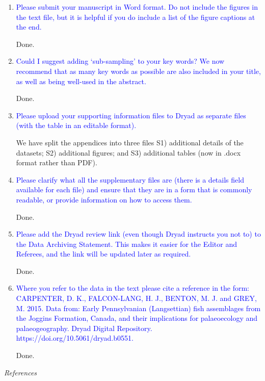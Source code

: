 \documentclass[12pt,letterpaper]{article}
\renewcommand{\subsection}[1]{%
\bigskip
\begin{center}
\begin{large}
\normalfont\itshape #1
\end{large}
\end{center}}
\begin{document}
\begin{enumerate}

\item{\textcolor{blue}{Please submit your manuscript in Word format. Do not include the figures in the text file, but it is helpful if you do include a list of the figure captions at the end.}}

Done.

\item{\textcolor{blue}{Could I suggest adding ‘sub-sampling’ to your key words? We now recommend that as many key words as possible are also included in your title, as well as being well-used in the abstract.}}

Done.

\item{\textcolor{blue}{Please upload your supporting information files to Dryad as separate files (with the table in an editable format).}}

We have split the appendices into three files S1) additional details of the datasets; S2) additional figures; and S3) additional tables (now in .docx format rather than PDF).

\item{\textcolor{blue}{Please clarify what all the supplementary files are (there is a details field available for each file) and ensure that they are in a form that is commonly readable, or provide information on how to access them.}}

Done. 

\item{\textcolor{blue}{Please add the Dryad review link (even though Dryad instructs you not to) to the Data Archiving Statement. This makes it easier for the Editor and Referees, and the link will be updated later as required.}}

Done.

\item{\textcolor{blue}{Where you refer to the data in the text please cite a reference in the form: CARPENTER, D. K., FALCON-LANG, H. J., BENTON, M. J. and GREY, M. 2015. Data
from: Early Pennsylvanian (Langsettian) fish assemblages from the Joggins
Formation, Canada, and their implications for palaeoecology and palaeogeography.
Dryad Digital Repository. https://doi.org/10.5061/dryad.b0551.}}

Done.

\end{enumerate}

\subsection{References}
\end{document}
